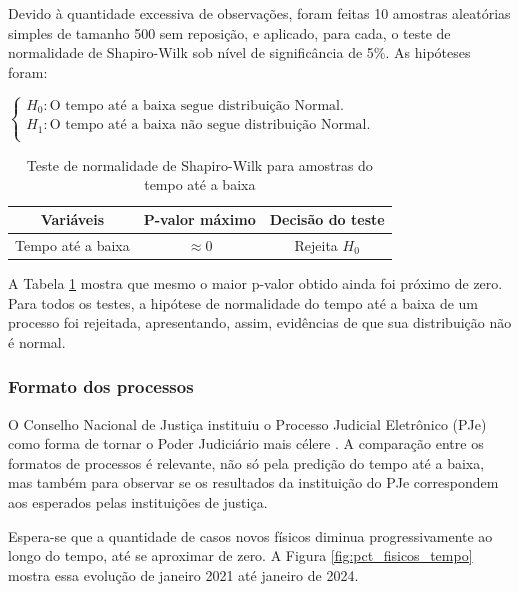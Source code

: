 Devido à quantidade excessiva de observações, foram feitas 10 amostras aleatórias simples de tamanho 500 sem reposição, e aplicado, para cada, o teste de normalidade de Shapiro-Wilk sob nível de significância de 5\%. As hipóteses foram:

$\begin{cases}
H_{0}: \mbox{O tempo até a baixa segue distribuição Normal.} \\
H_{1}: \mbox{O tempo até a baixa não segue distribuição Normal.}  \\
\end{cases}
$\\

\begin{table}[H]
\centering
\caption{Teste de normalidade de Shapiro-Wilk para amostras do tempo até a baixa}
\begin{tabular}{ccc}
\hline
\textbf{Variáveis} & \textbf{P-valor máximo} & \textbf{Decisão do teste} \\ \hline
Tempo até a baixa & $\approx 0$   & Rejeita $H_0$  \\ \hline  
\end{tabular}
\label{teste:normalidade_tempo}
\end{table}

A Tabela \ref{teste:normalidade_tempo} mostra que mesmo o maior p-valor obtido ainda foi próximo de zero. Para todos os testes, a hipótese de normalidade do tempo até a baixa de um processo foi rejeitada, apresentando, assim, evidências de que sua distribuição não é normal.


\subsubsection{Formato dos processos}
O Conselho Nacional de Justiça instituiu o Processo Judicial Eletrônico (PJe) como forma de tornar o Poder Judiciário mais célere \cite{pje}. A comparação entre os formatos de processos é relevante, não só pela predição do tempo até a baixa, mas também para observar se os resultados da instituição do PJe correspondem aos esperados pelas instituições de justiça.

Espera-se que a quantidade de casos novos físicos diminua progressivamente ao longo do tempo, até se aproximar de zero. A Figura \ref{fig:pct_fisicos_tempo} mostra essa evolução de janeiro 2021 até janeiro de 2024.

